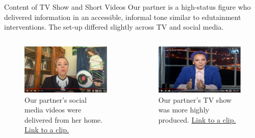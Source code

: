 \documentclass[10pt]{beamer}
\begin{document}
\begin{frame}{Content of TV Show and Short Videos}
Our partner is a high-status figure who delivered information in an accessible, informal tone similar to edutainment interventions. The set-up differed slightly across TV and social media.
\begin{columns}[T] \begin{column}{0.5\textwidth}
\begin{figure} \includegraphics[width = 1\textwidth]{Recruit_Intervention/Nehad_sm.png}\captionsetup{font=small}
\caption{Our partner's social media videos were delivered from her home.  \href{https://youtu.be/ganxQqVxXng?t=306.}{ Link to a clip.}} 
 \end{figure} 
\end{column}
\begin{column}{0.5\textwidth}
\begin{figure} \includegraphics[width = 1\textwidth]{Recruit_Intervention/Nehad_TV.png}\captionsetup{font=small}
\caption{Our partner's TV show was more highly produced. \href{https://youtu.be/6ERGJkAUal4?t=557}{Link to a clip.}} 
 \end{figure} 
\end{column}
\end{columns}

\end{frame}
\end{document}
